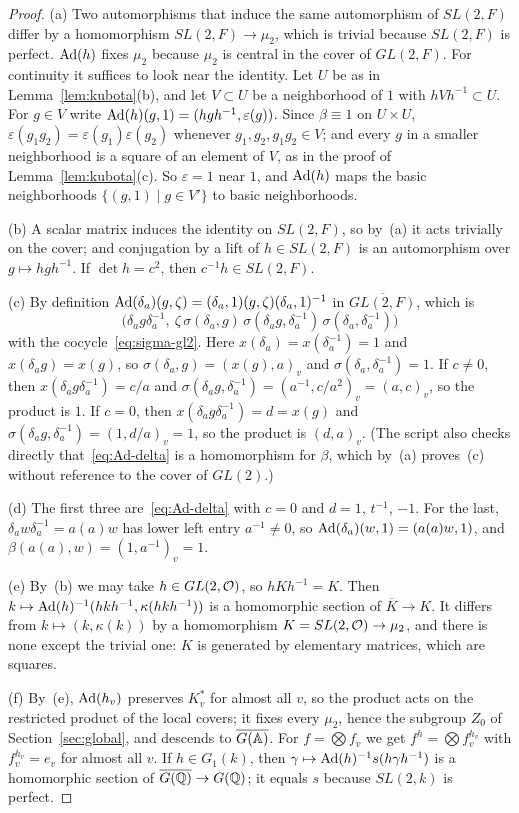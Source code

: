 \begin{proof}
(a) Two automorphisms that induce the same automorphism of $SL(2,F)$
differ by a homomorphism $SL(2,F)\to\mu_2$, which is trivial because
$SL(2,F)$ is perfect. $\operatorname{Ad}(h)$ fixes $\mu_2$ because $\mu_2$ is
central in the cover of $GL(2,F)$. For continuity it suffices to look
near the identity. Let $U$ be as in Lemma~\ref{lem:kubota}(b), and let
$V\subset U$ be a neighborhood of $1$ with $hVh^{-1}\subset U$. For
$g\in V$ write $\operatorname{Ad}(h)(g,1)=(hgh^{-1},\varepsilon(g))$. Since
$\beta\equiv1$ on $U\times U$, $\varepsilon(g_1g_2)=\varepsilon(g_1)
\varepsilon(g_2)$ whenever $g_1,g_2,g_1g_2\in V$; and every $g$ in a
smaller neighborhood is a square of an element of $V$, as in the proof of
Lemma~\ref{lem:kubota}(c). So $\varepsilon=1$ near $1$, and
$\operatorname{Ad}(h)$ maps the basic neighborhoods $\{(g,1)\mid g\in V'\}$ to
basic neighborhoods.

(b) A scalar matrix induces the identity on $SL(2,F)$, so by~(a) it acts
trivially on the cover; and conjugation by a lift of $h\in SL(2,F)$ is an
automorphism over $g\mapsto hgh^{-1}$. If $\det h=c^2$, then $c^{-1}h\in
SL(2,F)$.

(c) By definition $\operatorname{Ad}(\delta_a)(g,\zeta)=(\delta_a,1)(g,\zeta)
(\delta_a,1)^{-1}$ in $\overline{GL(2,F)}$, which is
\[
\bigl(\delta_ag\delta_a^{-1},\ \zeta\,\sigma(\delta_a,g)\,\sigma(\delta_ag,
\delta_a^{-1})\,\sigma(\delta_a,\delta_a^{-1})\bigr)
\]
with the cocycle~\eqref{eq:sigma-gl2}. Here $x(\delta_a)=x(\delta_a^{-1})=1$ and
$x(\delta_ag)=x(g)$, so $\sigma(\delta_a,g)=(x(g),a)_v$ and
$\sigma(\delta_a,\delta_a^{-1})=1$. If $c\ne0$, then $x(\delta_ag
\delta_a^{-1})=c/a$ and $\sigma(\delta_ag,\delta_a^{-1})=(a^{-1},c/a^2)_v
=(a,c)_v$, so the product is $1$. If $c=0$, then
$x(\delta_ag\delta_a^{-1})=d=x(g)$ and $\sigma(\delta_ag,\delta_a^{-1})=
(1,d/a)_v=1$, so the product is $(d,a)_v$. (The script also checks
directly that~\eqref{eq:Ad-delta} is a homomorphism for $\beta$, which
by~(a) proves~(c) without reference to the cover of $GL(2)$.)

(d) The first three are~\eqref{eq:Ad-delta} with $c=0$ and $d=1$,
$t^{-1}$, $-1$. For the last, $\delta_aw\delta_a^{-1}=a(a)w$ has lower
left entry $a^{-1}\ne0$, so $\operatorname{Ad}(\delta_a)(w,1)=(a(a)w,1)$, and
$\beta(a(a),w)=(1,a^{-1})_v=1$.

(e) By~(b) we may take $h\in GL(2,\mathcal{O})$, so $hKh^{-1}=K$. Then
$k\mapsto\operatorname{Ad}(h)^{-1}(hkh^{-1},\kappa(hkh^{-1}))$ is a
homomorphic section of $\overline K\to K$. It differs from
$k\mapsto(k,\kappa(k))$ by a homomorphism $K=SL(2,\mathcal{O})\to\mu_2$, and there
is none except the trivial one: $K$ is generated by elementary matrices,
which are squares.

(f) By~(e), $\operatorname{Ad}(h_v)$ preserves $K_v^*$ for almost all $v$, so
the product acts on the restricted product of the local covers; it fixes
every $\mu_2$, hence the subgroup $Z_0$ of Section~\ref{sec:global}, and
descends to $\overline{G(\mathbb{A})}$. For $f=\bigotimes f_v$ we get
$f^h=\bigotimes f_v^{h_v}$ with $f_v^{h_v}=e_v$ for almost all $v$. If
$h\in G_1(k)$, then $\gamma\mapsto\operatorname{Ad}(h)^{-1}s(h\gamma h^{-1})$ is a
homomorphic section of $\overline{G(\mathbb{Q})}\to G(\mathbb{Q})$; it equals $s$ because
$SL(2,k)$ is perfect.
\end{proof}

